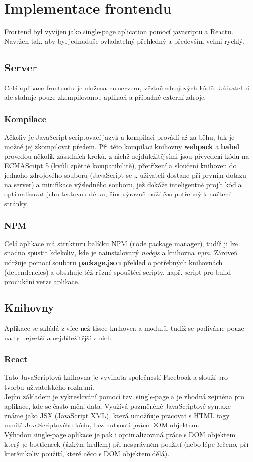 \chapter{Implementace frontendu}
Frontend byl vyvíjen jako single-page aplication pomocí javasriptu a Reactu.
Navržen tak, aby byl jednuduše ovladatelný přehledný a především velmi rychlý.

\section{Server}
Celá aplikace frontendu je uložena na serveru, včetně zdrojových kódů.
Uživatel si ale stahuje pouze zkompilovanou aplikaci a případné externí zdroje.
\subsection{Kompilace}
Ačkoliv je JavaScript scriptovací jazyk a kompilaci provádí až za běhu, tak je možné
jej zkompilovat předem. Při této kompilaci knihovny \textbf{webpack} a
\textbf{babel} provedou několik zásadních kroků, z nichž nejdůležitějsími jsou
převedení kódu na ECMAScript 5 (kvůli zpětné kompatibilitě), přetřízení a sloučení
knihoven do jednoho zdrojového souboru (JavaScript se k uživateli dostane při prvním dotazu na server) a
minifikace výsledného souboru, jež dokáže inteligentně projít kód a optimalizovat jeho textovou délku,
čím výrazně sníží čas potřebný k načtení stránky. 
\subsection{NPM}
Celá aplikace má strukturu balíčku NPM (node package manager), tudíž ji lze snadno
spustit kdekoliv, kde je nainstalovaný \textit{nodejs} a knihovna \textit{npm}.
Zároveň udržuje pomocí souboru \textbf{package.json} přehled o potřebných knihovnách (dependencies) a
obsahuje též různé spouštěcí scripty, např. script pro build produkční verze aplikace.

\section{Knihovny}
Aplikace se skládá z více než tisíce knihoven a modulů, tudíž se podíváme
pouze na ty nejvetší a nejdůležitější z nich.

\subsection{React}
Tato JavaScriptová knihovna je vyvinuta společností Facebook a slouží pro tvorbu uživatelského rozhraní.\\
Jejím základem je vykreslování pomocí tzv. single-page a je vhodná zejména pro aplikace, kde se často mění data.
Využívá pozměněné JavaScriptové syntaxe známe jako JSX (JavaScript XML), která umožňuje
pracovat s HTML tagy uvnitř JavaScriptového kódu, bez nutnosti práce DOM objektem.\\
Výhodou single-page aplikace je pak i optimalizovaná práce s DOM objektem, který je bottleneck
(úzkým hrdlem) při nesprávném použití (nebo lépe řečeno, při kterémkoliv použití, které něco s DOM objektem dělá).

